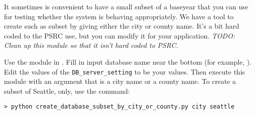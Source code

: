 It sometimes is convenient to have a small subset of a baseyear that you can 
use for testing whether the system is behaving appropriately.  We have a tool 
to create such as subset by giving either the city or county name.  It's a bit
hard coded to the PSRC \psrcindex use, but you can modify it for your application. 
\emph{TODO: Clean up this module so that it isn't hard coded to PSRC.}

Use the  module in 
. Fill in input database name near the bottom (for 
example, ). \psrcindex  Edit the values of the 
\verb|DB_server_setting| to be your values. Then execute this module with an 
argument that is a city name or a county name. To create a subset of Seattle,
only, use the command:
\pythonindex
\begin{verbatim}
> python create_database_subset_by_city_or_county.py city seattle 
\end{verbatim}